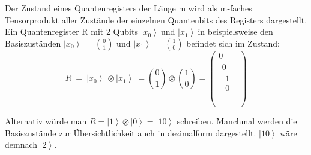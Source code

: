 Der Zustand eines Quantenregisters der Länge m wird als m-faches Tensorprodukt aller Zustände der einzelnen Quantenbits des Registers dargestellt. Ein Quantenregister R mit 2 Qubits $\left|\left.x_0\right\rangle\ \right.$und $\left|\left.x_1\right\rangle\ \right.$in beispielsweise den Basiszuständen $\left|\left.x_0\right\rangle\ \right.=\binom{0}{1}$ und $\left|\left.x_1\right\rangle\ \right.=\binom{1}{0}$ befindet sich im Zustand:
$$R\ =\ \left|\left.x_0\right\rangle\ \right.\otimes\left|\left.x_1\right\rangle\ \right.=\binom{0}{1}\otimes\binom{1}{0}=\left(\begin{matrix}0\\\begin{matrix}0\\\begin{matrix}1\\0\\\end{matrix}\\\end{matrix}\\\end{matrix}\right)$$

Alternativ würde man $R=\left|1\right\rangle\otimes\left|0\right\rangle=\left|10\right\rangle$ schreiben. Manchmal werden die Basiszustände zur Übersichtlichkeit auch in dezimalform dargestellt. $\left|10\right\rangle$ wäre demnach $\left|2\right\rangle$. 


